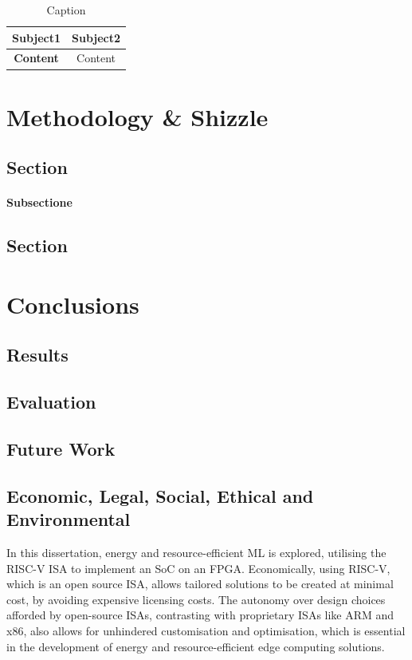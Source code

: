 \documentclass[a4paper,12pt]{report}
\begin{document}
\begin{table}[htbp]
    \centering
    \caption{Caption}
    \begin{tabular}{|c|c|}
    \hline
    \textbf{Subject1} & \textbf{Subject2} \\ \hline
    \textbf{Content} &  Content \\ \hline
    \hline 
    \end{tabular}
\end{table}

\chapter{Methodology \& Shizzle}
\section{Section}



\subsubsection{Subsectione}


\section{Section}



\chapter{Conclusions}
\section{Results}
\section{Evaluation}
\section{Future Work}

\section{Economic, Legal, Social, Ethical and Environmental }
In this dissertation, energy and resource-efficient ML is explored, utilising the RISC-V ISA to implement an SoC on an FPGA. Economically, using RISC-V, which is an open source ISA, allows tailored solutions to be created at minimal cost, by avoiding expensive licensing costs. The autonomy over design choices afforded by open-source ISAs, contrasting with proprietary ISAs like ARM and x86, also allows for unhindered customisation and optimisation, which is essential in the development of energy and resource-efficient edge computing solutions. 
\end{document}
